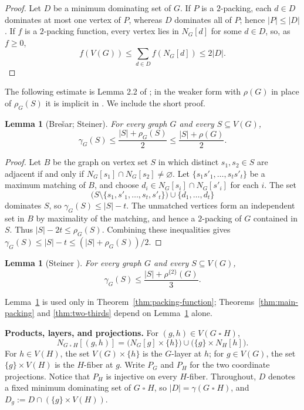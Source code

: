\documentclass[10pt]{amsart}
\newtheorem{lemma}[theorem]{Lemma}
\theoremstyle{remark}
\newcommand{\N}{N}
\newcommand{\V}{V}
\newcommand{\PG}{P_G}
\newcommand{\PH}{P_H}
\newcommand{\rhoTwo}{\rho^{\{2\}}}
\begin{document}
\begin{proof}
Let $D$ be a minimum dominating set of $G$. If $P$ is a $2$-packing, each
$d\in D$ dominates at most one vertex of $P$, whereas $D$ dominates all of
$P$; hence $|P|\leq|D|$. If $f$ is a $2$-packing function, every vertex lies
in $\N_G[d]$ for some $d\in D$, so, as $f\geq0$,
\[
 f(\V(G))\leq\sum_{d\in D}f(\N_G[d])\leq2|D|.
\]
\end{proof}

The following estimate is Lemma 2.2 of \cite{Steiner2026}; in the weaker form
with $\rho(G)$ in place of $\rho_G(S)$ it is implicit in
\cite{Bresar2017}. We include the short proof.

\begin{lemma}[Bre\v{s}ar; Steiner]\label{lem:bresar-steiner}
For every graph $G$ and every $S\subseteq\V(G)$,
\[
 \gamma_G(S)\leq\frac{|S|+\rho_G(S)}2
 \leq\frac{|S|+\rho(G)}2.
\]
\end{lemma}

\begin{proof}
Let $B$ be the graph on vertex set $S$ in which distinct $s_1,s_2\in S$ are
adjacent if and only if $\N_G[s_1]\cap\N_G[s_2]\neq\varnothing$. Let
$\{s_1s'_1,\ldots,s_ts'_t\}$ be a maximum matching of $B$, and choose
$d_i\in\N_G[s_i]\cap\N_G[s'_i]$ for each $i$. The set
\[
 \bigl(S\setminus\{s_1,s'_1,\ldots,s_t,s'_t\}\bigr)
 \cup\{d_1,\ldots,d_t\}
\]
dominates $S$, so $\gamma_G(S)\leq|S|-t$. The unmatched vertices form an
independent set in $B$ by maximality of the matching, and hence a $2$-packing
of $G$ contained in $S$. Thus $|S|-2t\leq\rho_G(S)$. Combining these
inequalities gives
$\gamma_G(S)\leq|S|-t\leq(|S|+\rho_G(S))/2$.
\end{proof}

\begin{lemma}[Steiner \cite{Steiner2026}]\label{lem:steiner-subset}
For every graph $G$ and every $S\subseteq\V(G)$,
\[
 \gamma_G(S)\leq\frac{|S|+\rhoTwo(G)}3.
\]
\end{lemma}

Lemma~\ref{lem:steiner-subset} is used only in
Theorem~\ref{thm:packing-function}; Theorems~\ref{thm:main-packing} and
\ref{thm:two-thirds} depend on Lemma~\ref{lem:bresar-steiner} alone.

\medskip
\noindent\textbf{Products, layers, and projections.}
For $(g,h)\in\V(G\mathbin{\square}H)$,
\begin{equation}
 \N_{G\mathbin{\square}H}[(g,h)]
 =\bigl(\N_G[g]\times\{h\}\bigr)
 \cup\bigl(\{g\}\times\N_H[h]\bigr).
 \label{eq:closed-product}
\end{equation}
For $h\in\V(H)$, the set $\V(G)\times\{h\}$ is the $G$-layer at $h$; for
$g\in\V(G)$, the set $\{g\}\times\V(H)$ is the $H$-fiber at $g$. Write
$\PG$ and $\PH$ for the two coordinate projections. Notice that $\PH$ is
injective on every $H$-fiber. Throughout, $D$ denotes a fixed minimum
dominating set of $G\mathbin{\square}H$, so
$|D|=\gamma(G\mathbin{\square}H)$, and
$D_g:=D\cap(\{g\}\times\V(H))$.
\end{document}
